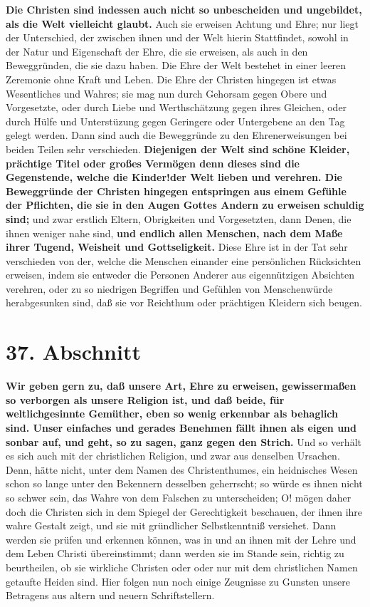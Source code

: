 \textbf{Die Christen sind indessen auch nicht so unbescheiden und ungebildet,
als die
Welt vielleicht glaubt.} Auch sie erweisen Achtung und Ehre; nur liegt der
Unterschied, der zwischen ihnen und der Welt hierin Stattfindet, sowohl in der
Natur und Eigenschaft der Ehre, die sie erweisen, als auch in den Beweggründen,
die sie dazu haben. Die Ehre der Welt bestehet in einer leeren Zeremonie ohne
Kraft und Leben. Die Ehre der Christen hingegen ist etwas Wesentliches und
Wahres; sie mag nun durch Gehorsam gegen Obere und Vorgesetzte, oder durch Liebe
und Werthschätzung gegen ihres Gleichen, oder durch Hülfe und Unterstüzung gegen
Geringere oder Untergebene an den Tag gelegt werden. Dann sind auch die
Beweggründe zu den Ehrenerweisungen bei beiden Teilen sehr verschieden.
\label{ref:09_36_ehre_erweisen} \textbf{Diejenigen der Welt sind schöne  Kleider, prächtige Titel oder großes
Vermögen denn dieses sind die Gegenstende, welche die Kinder!der Welt
 lieben und
verehren. Die Beweggründe der Christen hingegen entspringen aus einem Gefühle
der Pflichten, die sie in den Augen Gottes Andern zu erweisen schuldig sind;}
und
zwar erstlich Eltern, Obrigkeiten und Vorgesetzten, dann Denen, die ihnen
weniger nahe sind, \textbf{und endlich allen Menschen, nach dem Maße ihrer
Tugend,
Weisheit und Gottseligkeit.} Diese Ehre ist in der Tat sehr verschieden von der,
welche die Menschen einander eine persönlichen Rücksichten erweisen, indem sie
entweder die Personen Anderer aus eigennützigen Absichten verehren, oder zu so
niedrigen Begriffen und Gefühlen von Menschenwürde herabgesunken sind, daß sie
vor Reichthum oder prächtigen Kleidern sich beugen.

\section{37. Abschnitt} \label{kap9_ab37}

\label{ref:09_37_ehre_erweisen} \textbf{Wir geben gern zu, daß unsere Art,
Ehre zu erweisen, gewissermaßen so verborgen
als unsere Religion ist, und daß beide, für weltlichgesinnte Gemüther, eben so
wenig erkennbar als behaglich sind. Unser einfaches und gerades Benehmen fällt
ihnen als eigen und sonbar auf, und geht, so zu sagen, ganz gegen den Strich.}
Und so verhält es sich auch mit der christlichen Religion, und zwar aus
denselben Ursachen. Denn, hätte nicht, unter dem Namen des Christenthumes, ein
heidnisches Wesen schon so lange unter den Bekennern desselben geherrscht; so
würde es ihnen nicht so schwer sein, das Wahre von dem Falschen zu
unterscheiden; O! mögen daher doch die Christen sich in dem Spiegel der
Gerechtigkeit beschauen, der ihnen ihre wahre Gestalt zeigt, und sie mit
gründlicher Selbstkenntniß versiehet. Dann werden sie prüfen und erkennen
können, was in und an ihnen mit der Lehre und dem Leben Christi übereinstimmt;
dann werden sie im Stande sein, richtig zu beurtheilen, ob sie wirkliche
Christen oder oder nur mit dem christlichen Namen getaufte Heiden  sind. Hier
folgen nun noch einige Zeugnisse zu Gunsten unsere Betragens aus altern und
neuern Schriftstellern.


